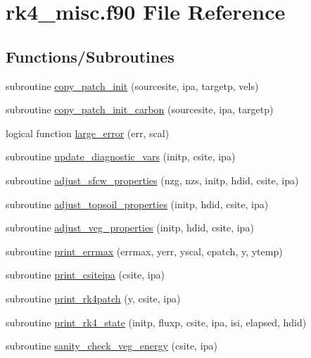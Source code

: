 \hypertarget{rk4__misc_8f90}{}\section{rk4\+\_\+misc.\+f90 File Reference}
\label{rk4__misc_8f90}
\subsection*{Functions/\+Subroutines}
\begin{DoxyCompactItemize}
\item 
subroutine \hyperlink{rk4__misc_8f90_af8d28242336eb3eea82b1407e0b6118b}{copy\+\_\+patch\+\_\+init} (sourcesite, ipa, targetp, vels)
\item 
subroutine \hyperlink{rk4__misc_8f90_acf1b47a1e84fc477c7b7179411ae345f}{copy\+\_\+patch\+\_\+init\+\_\+carbon} (sourcesite, ipa, targetp)
\item 
logical function \hyperlink{rk4__misc_8f90_a9be8b0e1d2df1a3ab85aae8eee3e737a}{large\+\_\+error} (err, scal)
\item 
subroutine \hyperlink{rk4__misc_8f90_a0ab2c98c1ad9c2055600815f75fef779}{update\+\_\+diagnostic\+\_\+vars} (initp, csite, ipa)
\item 
subroutine \hyperlink{rk4__misc_8f90_a448613e9ace46418bfb1218a1e3b701c}{adjust\+\_\+sfcw\+\_\+properties} (nzg, nzs, initp, hdid, csite, ipa)
\item 
subroutine \hyperlink{rk4__misc_8f90_a7181f5dc707036788f8ed40c16d78d83}{adjust\+\_\+topsoil\+\_\+properties} (initp, hdid, csite, ipa)
\item 
subroutine \hyperlink{rk4__misc_8f90_a6741f38346d51505217b88657ccd054d}{adjust\+\_\+veg\+\_\+properties} (initp, hdid, csite, ipa)
\item 
subroutine \hyperlink{rk4__misc_8f90_a1d266c77b467c6a7e6ffc5a306e9f09c}{print\+\_\+errmax} (errmax, yerr, yscal, cpatch, y, ytemp)
\item 
subroutine \hyperlink{rk4__misc_8f90_ac929ca000697364078cbd58ed3223fcf}{print\+\_\+csiteipa} (csite, ipa)
\item 
subroutine \hyperlink{rk4__misc_8f90_a8cd79fd22a37f763e479d9c6000e0bc4}{print\+\_\+rk4patch} (y, csite, ipa)
\item 
subroutine \hyperlink{rk4__misc_8f90_a3ced9a061b960b374d71824bd3cca480}{print\+\_\+rk4\+\_\+state} (initp, fluxp, csite, ipa, isi, elapsed, hdid)
\item 
subroutine \hyperlink{rk4__misc_8f90_a3d41f125f782c256542307c08beecbc2}{sanity\+\_\+check\+\_\+veg\+\_\+energy} (csite, ipa)
\end{DoxyCompactItemize}


